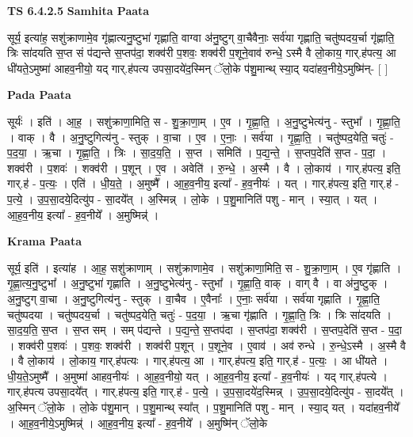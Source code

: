 \documentclass[17pt]{extarticle}
\begin{document}
\textbf{TS 6.4.2.5 } \newline
\textbf{Samhita Paata} \newline

सूर्य॒ इत्या॑ह॒ सशु॑क्राणामे॒व गृ॑ह्णात्यनु॒ष्टुभा॑ गृह्णाति॒ वाग्वा अ॑नु॒ष्टुग् वा॒चैवैनाः॒ सर्व॑या गृह्णाति॒ चतु॑ष्पदय॒र्चा गृ॑ह्णाति॒ त्रिः सा॑दयति स॒प्त सं प॑द्यन्ते स॒प्तप॑दा॒ शक्व॑री प॒शवः॒ शक्व॑री प॒शूने॒वाव॑ रुन्धे॒ ऽस्मै वै लो॒काय॒ गार्.ह॑पत्य॒ आ धी॑यते॒ऽमुष्मा॑ आहव॒नीयो॒ यद् गार्.ह॑पत्य उपसा॒दये॑द॒स्मिन् ॅलो॒के प॑शु॒मान्थ् स्या॒द् यदा॑हव॒नीये॒ऽमुष्मि॑न्- [  ] \newline

\textbf{Pada Paata} \newline

सूर्यः॑ । इति॑ । आ॒ह॒ । सशु॑क्राणा॒मिति॒ स - शु॒क्रा॒णा॒म् । ए॒व । गृ॒ह्णा॒ति॒ । अ॒नु॒ष्टुभेत्य॑नु - स्तुभा᳚ । गृ॒ह्णा॒ति॒ । वाक् । वै । अ॒नु॒ष्टुगित्य॑नु - स्तुक् । वा॒चा । ए॒व । ए॒नाः॒ । सर्व॑या । गृ॒ह्णा॒ति॒ । चतु॑ष्पद॒येति॒ चतुः॑ - प॒द॒या॒ । ऋ॒चा । गृ॒ह्णा॒ति॒ । त्रिः । सा॒द॒य॒ति॒ । स॒प्त । समिति॑ । प॒द्य॒न्ते॒ । स॒प्तप॒देति॑ स॒प्त - प॒दा॒ । शक्व॑री । प॒शवः॑ । शक्व॑री । प॒शून् । ए॒व । अवेति॑ । रु॒न्धे॒ । अ॒स्मै । वै । लो॒काय॑ । गार्.ह॑पत्य॒ इति॒ गार्.ह॑ - प॒त्यः॒ । एति॑ । धी॒य॒ते॒ । अ॒मुष्मै᳚ । आ॒ह॒व॒नीय॒ इत्या᳚ - ह॒व॒नीयः॑ । यत् । गार्.ह॑पत्य॒ इति॒ गार्.ह॑ - प॒त्ये॒ । उ॒प॒सा॒दये॒दित्यु॑प - सा॒दये᳚त् । अ॒स्मिन्न् । लो॒के । प॒शु॒मानिति॑ पशु - मान् । स्या॒त् । यत् । आ॒ह॒व॒नीय॒ इत्या᳚ - ह॒व॒नीये᳚ । अ॒मुष्मिन्न्॑ ।  \newline


\textbf{Krama Paata} \newline

सूर्य॒ इति॑ । इत्या॑ह । आ॒ह॒ सशु॑क्राणाम् । सशु॑क्राणामे॒व । सशु॑क्राणा॒मिति॒ स - शु॒क्रा॒णा॒म् । ए॒व गृ॑ह्णाति । गृ॒ह्णा॒त्य॒नु॒ष्टुभा᳚ । अ॒नु॒ष्टुभा॑ गृह्णाति । अ॒नु॒ष्टुभेत्य॑नु - स्तुभा᳚ । गृ॒ह्णा॒ति॒ वाक् । वाग् वै । वा अ॑नु॒ष्टुक् । अ॒नु॒ष्टुग् वा॒चा । अ॒नु॒ष्टुगित्य॑नु - स्तुक् । वा॒चैव । ए॒वैनाः᳚ । ए॒नाः॒ सर्व॑या । सर्व॑या गृह्णाति । गृ॒ह्णा॒ति॒ चतु॑ष्पदया । चतु॑ष्पदय॒र्चा । चतु॑ष्पद॒येति॒ चतुः॑ - प॒द॒या॒ । ऋ॒चा गृ॑ह्णाति । गृ॒ह्णा॒ति॒ त्रिः । त्रिः सा॑दयति । सा॒द॒य॒ति॒ स॒प्त । स॒प्त सम् । सम् प॑द्यन्ते । प॒द्य॒न्ते॒ स॒प्तप॑दा । स॒प्तप॑दा॒ शक्व॑री । स॒प्तप॒देति॑ स॒प्त - प॒दा॒ । शक्व॑री प॒शवः॑ । प॒शवः॒ शक्व॑री । शक्व॑री प॒शून् । प॒शूने॒व । ए॒वाव॑ । अव॑ रुन्धे । रु॒न्धे॒ऽस्मै । अ॒स्मै वै । वै लो॒काय॑ । लो॒काय॒ गार्.ह॑पत्यः । गार्.ह॑पत्य॒ आ । गार्.ह॑पत्य॒ इति॒ गार्.ह॑ - प॒त्यः॒ । आ धी॑यते । धी॒य॒ते॒ऽमुष्मै᳚ । अ॒मुष्मा॑ आहव॒नीयः॑ । आ॒ह॒व॒नीयो॒ यत् । आ॒ह॒व॒नीय॒ इत्या᳚ - ह॒व॒नीयः॑ । यद् गार्.ह॑पत्ये । गार्.ह॑पत्य उपसा॒दये᳚त् । गार्.ह॑पत्य॒ इति॒ गार्.ह॑ - प॒त्ये॒ । उ॒प॒सा॒दये॑द॒स्मिन्न् । उ॒प॒सा॒दये॒दित्यु॑प - सा॒दये᳚त् । अ॒स्मिन् ॅलो॒के । लो॒के प॑शु॒मान् । प॒शु॒मान्थ् स्या᳚त् । प॒शु॒मानिति॑ पशु - मान् । स्या॒द् यत् । यदा॑हव॒नीये᳚ । आ॒ह॒व॒नीये॒ऽमुष्मिन्न्॑ । आ॒ह॒व॒नीय॒ इत्या᳚ - ह॒व॒नीये᳚ । अ॒मुष्मि॑न् ॅलो॒के \newline
\end{document}
